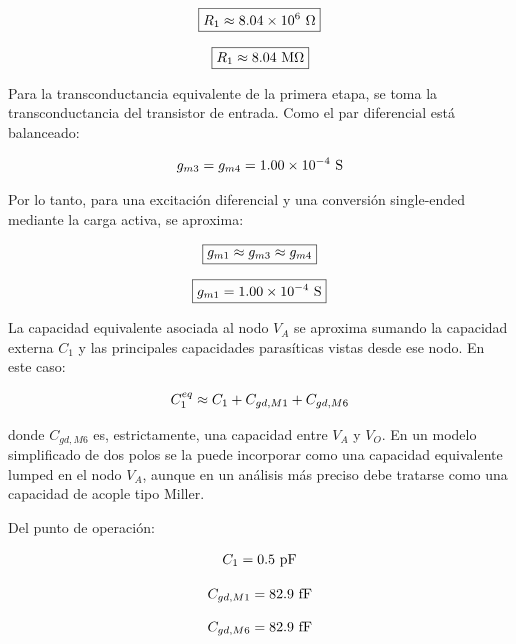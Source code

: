 \begin{equation}\notag
\boxed{
R_1\approx 8.04\times 10^{6}\ \Omega
}
\end{equation}

\begin{equation}\notag
\boxed{
R_1\approx 8.04\ \mathrm{M\Omega}
}
\end{equation}

Para la transconductancia equivalente de la primera etapa, se toma la transconductancia del transistor de entrada. Como el par diferencial está balanceado:

\begin{equation}\notag
g_{m3}=g_{m4}=1.00\times 10^{-4}\ \mathrm{S}
\end{equation}

Por lo tanto, para una excitación diferencial y una conversión single-ended mediante la carga activa, se aproxima:

\begin{equation}\notag
\boxed{
g_{m1}\approx g_{m3}\approx g_{m4}
}
\end{equation}

\begin{equation}\notag
\boxed{
g_{m1}=1.00\times 10^{-4}\ \mathrm{S}
}
\end{equation}

La capacidad equivalente asociada al nodo \(V_A\) se aproxima sumando la capacidad externa \(C_1\) y las principales capacidades parasíticas vistas desde ese nodo. En este caso:

\begin{equation}\notag
C_1^{eq}
\approx
C_1
+
C_{gd,M1}
+
C_{gd,M6}
\end{equation}

donde \(C_{gd,M6}\) es, estrictamente, una capacidad entre \(V_A\) y \(V_O\). En un modelo simplificado de dos polos se la puede incorporar como una capacidad equivalente lumped en el nodo \(V_A\), aunque en un análisis más preciso debe tratarse como una capacidad de acople tipo Miller.

Del punto de operación:

\begin{equation}\notag
C_1=0.5\ \mathrm{pF}
\end{equation}

\begin{equation}\notag
C_{gd,M1}=82.9\ \mathrm{fF}
\end{equation}

\begin{equation}\notag
C_{gd,M6}=82.9\ \mathrm{fF}
\end{equation}

